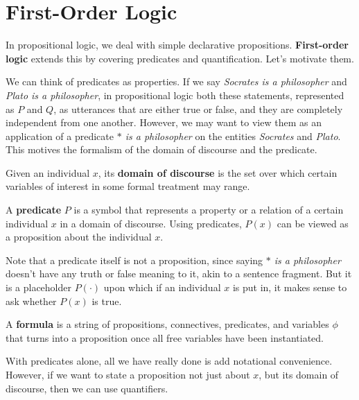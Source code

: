 \section{First-Order Logic} 

  In propositional logic, we deal with simple declarative propositions. \textbf{First-order logic} extends this by covering predicates and quantification. Let's motivate them. 

  We can think of predicates as properties. If we say \textit{Socrates is a philosopher} and \textit{Plato is a philosopher}, in propositional logic both these statements, represented as $P$ and $Q$, as utterances that are either true or false, and they are completely independent from one another. However, we may want to view them as an application of a predicate \textit{ $\ast$ is a philosopher} on the entities \textit{Socrates} and \textit{Plato}. This motives the formalism of the domain of discourse and the predicate. 

  \begin{definition}
    Given an individual $x$, its \textbf{domain of discourse} is the set over which certain variables of interest in some formal treatment may range. 
  \end{definition}

  \begin{definition}[Predicate]
    A \textbf{predicate} $P$ is a symbol that represents a property or a relation of a certain individual $x$ in a domain of discourse. Using predicates, $P(x)$ can be viewed as a proposition about the individual $x$. 
  \end{definition} 

  Note that a predicate itself is not a proposition, since saying \textit{$\ast$ is a philosopher} doesn't have any truth or false meaning to it, akin to a sentence fragment. But it is a placeholder $P(\cdot)$ upon which if an individual $x$ is put in, it makes sense to ask whether $P(x)$ is true. 

  \begin{definition}[Formula]
    A \textbf{formula} is a string of propositions, connectives, predicates, and variables $\phi$ that turns into a proposition once all free variables have been instantiated. 
  \end{definition}

  With predicates alone, all we have really done is add notational convenience. However, if we want to state a proposition not just about $x$, but its domain of discourse, then we can use quantifiers. 

